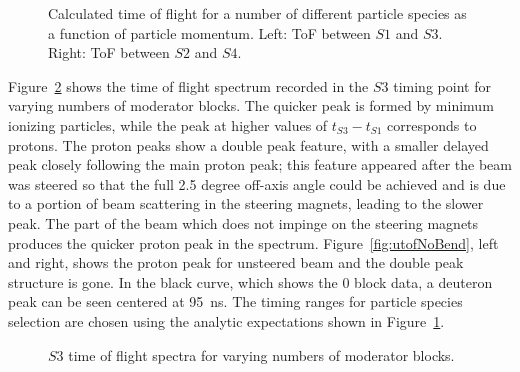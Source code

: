 \begin{figure}[ht]
  
  \begin{minipage}[t]{0.49\textwidth}
    \begin{adjustbox}{max totalsize={\textwidth}{.5\textheight},center}
      
    \end{adjustbox}
  \end{minipage}
  \hfill
  \begin{minipage}[t]{0.49\textwidth}
    \begin{adjustbox}{max totalsize={\textwidth}{.5\textheight},center}
      
    \end{adjustbox}
  \end{minipage}
   \caption{\label{fig:s1s3PredTimes}Calculated time of flight for a number of different particle species as a function of particle momentum. Left: ToF between $\mathit{S1}$ and $\mathit{S3}$. Right: ToF between $\mathit{S2}$ and $\mathit{S4}$.}
\end{figure}

Figure~\ref{fig:s3tof} shows the time of flight spectrum recorded in the $\mathit{S3}$ timing point for varying numbers of moderator blocks.
The quicker peak is formed by minimum ionizing particles, while the peak at higher values of $\mathit{t_{S3}} - \mathit{t_{S1}}$ corresponds to protons.
The proton peaks show a double peak feature, with a smaller delayed peak closely following the main proton peak; this feature appeared after the beam was steered so that the full 2.5 degree off-axis angle could be achieved and is due to a portion of beam scattering in the steering magnets, leading to the slower peak.
The part of the beam which does not impinge on the steering magnets produces the quicker proton peak in the spectrum.
Figure~\ref{fig:utofNoBend}, left and right, shows the proton peak for unsteered beam and the double peak structure is gone.
In the black curve, which shows the 0 block data, a deuteron peak can be seen centered at 95~ns.
The timing ranges for particle species selection are chosen using the analytic expectations shown in Figure~\ref{fig:s1s3PredTimes}.

\begin{figure}[h]
  \begin{adjustbox}{max totalsize={.7\textwidth}{.5\textheight},center}
    
  \end{adjustbox}
  \caption{$\mathit{S3}$ time of flight spectra for varying numbers of moderator blocks.}
  \label{fig:s3tof}
\end{figure}

